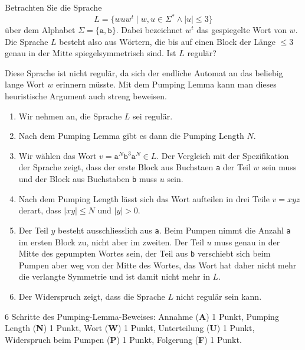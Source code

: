 Betrachten Sie die Sprache
\[
L
=
\{
wuw^t
\mid
w,u\in\Sigma^*\wedge |u|\le 3
\}
\]
über dem Alphabet $\Sigma=\{\texttt{a},\texttt{b}\}$.
Dabei bezeichnet $w^t$ das gespiegelte Wort von $w$.
Die Sprache $L$ besteht also aus Wörtern, die bis auf einen Block
der Länge $\le 3$ genau in der Mitte spiegelsymmetrisch sind.
Ist $L$ regulär?

\begin{loesung}
Diese Sprache ist nicht regulär, da sich der endliche Automat an das
beliebig lange Wort $w$ erinnern müsste.
Mit dem Pumping Lemma kann man dieses heuristische Argument auch streng
beweisen.
\begin{enumerate}
\item
Wir nehmen an, die Sprache $L$ sei regulär.
\item
Nach dem Pumping Lemma gibt es dann die Pumping Length $N$.
\item
Wir wählen das Wort
$v=\texttt{a}^N\texttt{b}^3\texttt{a}^N\in L$.
Der Vergleich mit der Spezifikation der Sprache zeigt, dass der erste
Block aus Buchstaen \texttt{a} der Teil $w$ sein muss und der Block aus 
Buchstaben \texttt{b} muss $u$ sein.
\item
Nach dem Pumping Length lässt sich das Wort aufteilen in drei Teile
$v=xyz$ derart, dass $|xy|\le N$ und $|y|>0$.
\item
Der Teil $y$ besteht ausschliesslich aus \texttt{a}.
Beim Pumpen nimmt die Anzahl \texttt{a} im ersten Block zu, nicht
aber im zweiten.
Der Teil $u$ muss genau in der Mitte des gepumpten Wortes sein,
der Teil aus \texttt{b} verschiebt sich beim Pumpen aber weg von
der Mitte des Wortes, das Wort hat daher nicht mehr die verlangte
Symmetrie und ist damit nicht mehr in $L$.
\item
Der Widerspruch zeigt, dass die Sprache $L$ nicht regulär sein kann.
\qedhere
\end{enumerate}
\end{loesung}

\begin{bewertung}
6 Schritte des Pumping-Lemma-Beweises:
Annahme ({\bf A}) 1 Punkt,
Pumping Length ({\bf N}) 1 Punkt,
Wort ({\bf W}) 1 Punkt,
Unterteilung ({\bf U}) 1 Punkt,
Widerspruch beim Pumpen ({\bf P}) 1 Punkt,
Folgerung ({\bf F}) 1 Punkt.
\end{bewertung}

